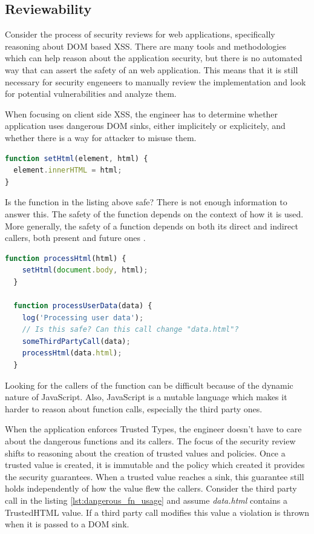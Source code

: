 \subsection{Reviewability}

Consider the process of security reviews for web applications, specifically reasoning about DOM
based XSS. There are many tools and methodologies which can help reason about the application
security, but there is no automated way that can assert the safety of an web application. This means that
it is still necessary for security engeneers to manually review the implementation and look for
potential vulnerabilities and analyze them.

When focusing on client side XSS, the engineer has to determine whether application uses dangerous
DOM sinks, either implicitely or explicitely, and whether there is a way for attacker to misuse them.

\bigskip
\begin{lstlisting}[language=JavaScript, caption=Possibly dangerous function]
function setHtml(element, html) {
  element.innerHTML = html;
}
\end{lstlisting}

Is the function in the listing above safe? There is not enough information to answer this. The
safety of the function depends on the context of how it is used. More generally, the safety of a
function depends on both its direct and indirect callers, both present and future ones
\cite{tt_design_history}.

\bigskip
\begin{lstlisting}[language=JavaScript, caption=Usage of the possibly dangerous function, label={lst:dangerous_fn_usage}]
  function processHtml(html) {
    setHtml(document.body, html);
  }

  function processUserData(data) {
    log('Processing user data');
    // Is this safe? Can this call change "data.html"?
    someThirdPartyCall(data);
    processHtml(data.html);
  }
\end{lstlisting}

Looking for the callers of the function can be difficult because of the dynamic nature of
JavaScript. Also, JavaScript is a mutable language which makes it harder to reason about function
calls, especially the third party ones.

When the application enforces Trusted Types, the engineer doesn't have to care about the dangerous
functions and its callers. The focus of the security review shifts to reasoning about the creation
of trusted values and policies. Once a trusted value is created, it is immutable and the policy
which created it provides the security guarantees. When a trusted value reaches a sink, this
guarantee still holds independently of how the value flew the callers. Consider the third party call
in the listing \ref{lst:dangerous_fn_usage} and assume \emph{data.html} contains a TrustedHTML
value. If a third party call modifies this value a violation is thrown when it is passed to a DOM
sink.

